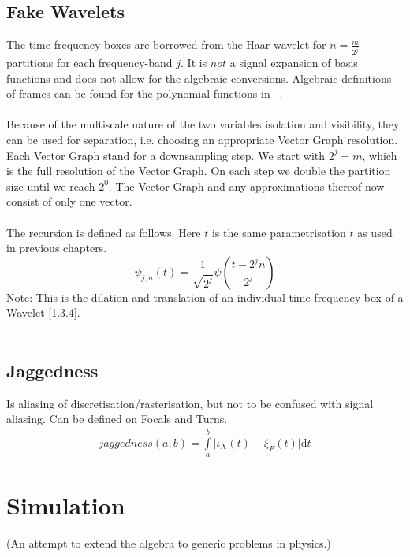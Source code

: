 \documentclass{report}
\begin{document}
\subsection{Fake Wavelets}
The time-frequency boxes are borrowed from the Haar-wavelet for $n=\frac{m}{2^j}$ partitions for each frequency-band $j$. It is $not$ a signal expansion of basis functions and does not allow for the algebraic conversions. Algebraic definitions of frames can be found for the polynomial functions in ~\cite[Spline\_Axioms.tex]{Axioms}.\\\\
Because of the multiscale nature of the two variables isolation and visibility, they can be used for separation, i.e. choosing an appropriate Vector Graph resolution. Each Vector Graph stand for a downsampling step. We start with $2^j=m$, which is the full resolution of the Vector Graph. On each step we double the partition size until we reach $2^0$. The Vector Graph and any approximations thereof now consist of only one vector.\\\\
The recursion is defined as follows. Here $t$ is the same parametrisation $t$ as used in previous chapters.
\begin{equation}
\psi_{j,n}(t)=\frac{1}{\sqrt{2^j}}\psi(\frac{t-2^j n}{2^j})
\end{equation}
Note: This is the dilation and translation of an individual time-frequency box of a Wavelet \cite{Mallat}[1.3.4].\\\\

\subsection{Jaggedness}
Is aliasing of discretisation/rasterisation, but not to be confused with signal aliasing. Can be defined on Focals and Turns.
\begin{align}
jaggedness(a,b)=\int \limits _{a}^{b} \lvert \iota_{X}(t)-\xi_{F}(t)\rvert \mathrm{d}t
\end{align}

\section{Simulation}
(An attempt to extend the algebra to generic problems in physics.)\\\\
\end{document}
